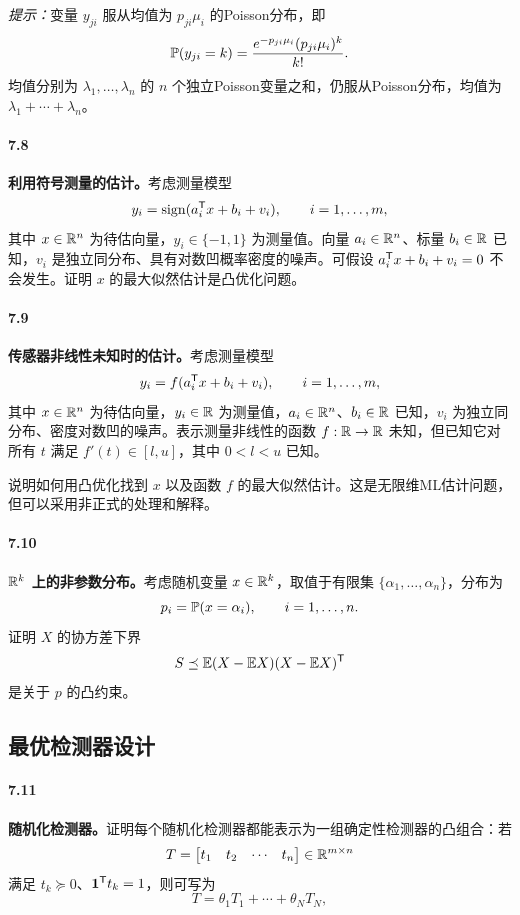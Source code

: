 \emph{提示：}变量 $y_{ji}$ 服从均值为 $p_{ji}\mu_i$ 的Poisson分布，即
\[
 \mathbb P(y_{ji}=k)=\frac{e^{-p_{ji}\mu_i}(p_{ji}\mu_i)^k}{k!}.
\]
均值分别为 $\lambda_1,\ldots,\lambda_n$ 的 $n$ 个独立Poisson变量之和，仍服从Poisson分布，均值为 $\lambda_1+\cdots+\lambda_n$。

\paragraph{7.8}
\textbf{利用符号测量的估计。}考虑测量模型
\[
 y_i=\operatorname{sign}(a_i^{\mathsf T}x+b_i+v_i),\qquad i=1,\ldots,m,
\]
其中 $x\in\mathbb R^n$ 为待估向量，$y_i\in\{-1,1\}$ 为测量值。向量 $a_i\in\mathbb R^n$、标量 $b_i\in\mathbb R$ 已知，$v_i$ 是独立同分布、具有对数凹概率密度的噪声。可假设 $a_i^{\mathsf T}x+b_i+v_i=0$ 不会发生。证明 $x$ 的最大似然估计是凸优化问题。

\paragraph{7.9}
\textbf{传感器非线性未知时的估计。}考虑测量模型
\[
 y_i=f(a_i^{\mathsf T}x+b_i+v_i),\qquad i=1,\ldots,m,
\]
其中 $x\in\mathbb R^n$ 为待估向量，$y_i\in\mathbb R$ 为测量值，$a_i\in\mathbb R^n$、$b_i\in\mathbb R$ 已知，$v_i$ 为独立同分布、密度对数凹的噪声。表示测量非线性的函数 $f:\mathbb R\to\mathbb R$ 未知，但已知它对所有 $t$ 满足 $f'(t)\in[l,u]$，其中 $0<l<u$ 已知。

说明如何用凸优化找到 $x$ 以及函数 $f$ 的最大似然估计。这是无限维ML估计问题，但可以采用非正式的处理和解释。

\paragraph{7.10}
\textbf{$\mathbb R^k$ 上的非参数分布。}考虑随机变量 $x\in\mathbb R^k$，取值于有限集 $\{\alpha_1,\ldots,\alpha_n\}$，分布为
\[
 p_i=\mathbb P(x=\alpha_i),\qquad i=1,\ldots,n.
\]
证明 $X$ 的协方差下界
\[
 S\preceq\mathbb E(X-\mathbb E X)(X-\mathbb E X)^{\mathsf T}
\]
是关于 $p$ 的凸约束。

\subsection*{最优检测器设计}
\paragraph{7.11}
\textbf{随机化检测器。}证明每个随机化检测器都能表示为一组确定性检测器的凸组合：若
\[
 T=\begin{bmatrix}t_1&t_2&\cdots&t_n\end{bmatrix}\in\mathbb R^{m\times n}
\]
满足 $t_k\succeq0$、$\mathbf 1^{\mathsf T}t_k=1$，则可写为
\[
 T=\theta_1T_1+\cdots+\theta_NT_N,
\]

